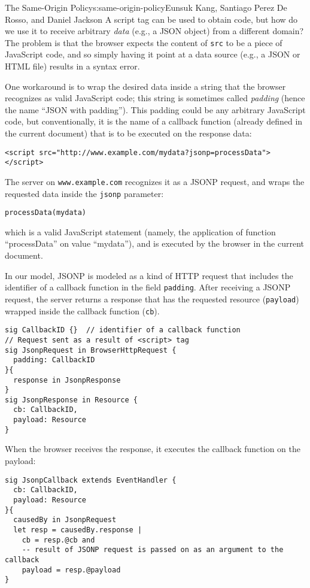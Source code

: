 \begin{aosachapter}{The Same-Origin Policy}{s:same-origin-policy}{Eunsuk Kang, Santiago Perez De Rosso, and Daniel Jackson}
A script tag can be used to obtain code, but how do we use it to receive
arbitrary \emph{data} (e.g., a JSON object) from a different domain? The
problem is that the browser expects the content of \texttt{src} to be a
piece of JavaScript code, and so simply having it point at a data source
(e.g., a JSON or HTML file) results in a syntax error.

One workaround is to wrap the desired data inside a string that the
browser recognizes as valid JavaScript code; this string is sometimes
called \emph{padding} (hence the name ``JSON with padding''). This
padding could be any arbitrary JavaScript code, but conventionally, it
is the name of a callback function (already defined in the current
document) that is to be executed on the response data:

\begin{verbatim}
<script src="http://www.example.com/mydata?jsonp=processData"></script>
\end{verbatim}

The server on \texttt{www.example.com} recognizes it as a JSONP request,
and wraps the requested data inside the \texttt{jsonp} parameter:

\begin{verbatim}
processData(mydata)
\end{verbatim}

which is a valid JavaScript statement (namely, the application of
function ``processData'' on value ``mydata''), and is executed by the
browser in the current document.

In our model, JSONP is modeled as a kind of HTTP request that includes
the identifier of a callback function in the field \texttt{padding}.
After receiving a JSONP request, the server returns a response that has
the requested resource (\texttt{payload}) wrapped inside the callback
function (\texttt{cb}).

\begin{verbatim}
sig CallbackID {}  // identifier of a callback function
// Request sent as a result of <script> tag
sig JsonpRequest in BrowserHttpRequest {
  padding: CallbackID
}{
  response in JsonpResponse
}
sig JsonpResponse in Resource {
  cb: CallbackID,
  payload: Resource
}
\end{verbatim}

When the browser receives the response, it executes the callback
function on the payload:

\begin{verbatim}
sig JsonpCallback extends EventHandler {
  cb: CallbackID,
  payload: Resource
}{
  causedBy in JsonpRequest
  let resp = causedBy.response | 
    cb = resp.@cb and
    -- result of JSONP request is passed on as an argument to the callback
    payload = resp.@payload
}
\end{verbatim}


\end{aosachapter}
